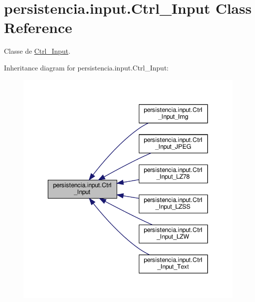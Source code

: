 \hypertarget{classpersistencia_1_1input_1_1Ctrl__Input}{}\section{persistencia.\+input.\+Ctrl\+\_\+\+Input Class Reference}
\label{classpersistencia_1_1input_1_1Ctrl__Input}


Classe de \hyperlink{classpersistencia_1_1input_1_1Ctrl__Input}{Ctrl\+\_\+\+Input}.  




Inheritance diagram for persistencia.\+input.\+Ctrl\+\_\+\+Input\+:\nopagebreak
\begin{figure}[H]
\begin{center}
\leavevmode
\includegraphics[width=340pt]{classpersistencia_1_1input_1_1Ctrl__Input__inherit__graph}
\end{center}
\end{figure}


